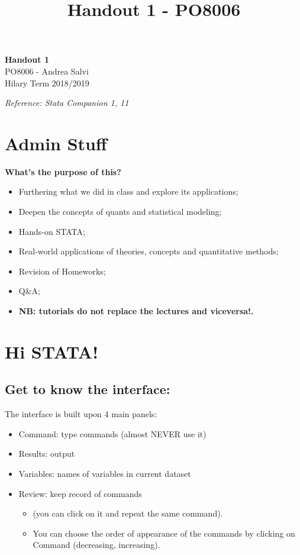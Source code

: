 \documentclass[11pt]{article}
\renewcommand{\baselinestretch}{1}
\theoremstyle{definition}
\begin{document}
\setcounter{section}{0}
\title{Handout 1 - PO8006}

\thispagestyle{empty}

\begin{center}
{\LARGE \bf Handout 1}\\
{\large PO8006 - Andrea Salvi}\\
Hilary Term 2018/2019
\end{center}
\renewcommand{\baselinestretch}{1}
\textit{Reference: Stata Companion 1, 11}

\section{Admin Stuff}

\textbf{What's the purpose of this?}
\begin{itemize}
\item Furthering what we did in class and explore its applications;
\item Deepen the concepts of quants and statistical modeling;
\item Hands-on STATA;
\item Real-world applications of theories, concepts and quantitative methods;
\item Revision of Homeworks;
\item Q\&A;
\item \textbf{NB: tutorials do not replace the lectures and viceversa!.}
\end{itemize}

\section{Hi STATA!}
\subsection{Get to know the interface: }
The interface is built upon 4 main panels:
\begin{itemize}
  \item Command: type commands (almost NEVER use it)
  \item Results: output
  \item Variables: names of variables in current dataset
  \item Review: keep record of commands
  \begin{itemize}
    \item (you can click on it and repeat the same command).
    \item You can choose the order of appearance of the commands by clicking on Command (decreasing, increasing).
  \end{itemize}
\end{itemize}
\end{document}
